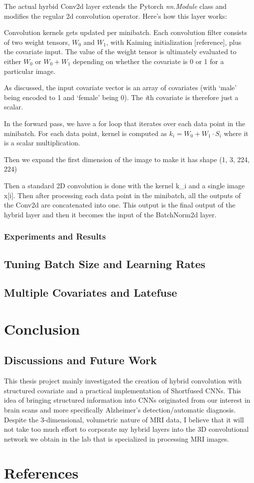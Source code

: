 \documentclass[12pt]{article}
\begin{document}
The actual hyrbid Conv2d layer extends the Pytorch \textit{nn.Module} class and modifies the regular 2d convolution operator. Here's how this layer works:

Convolution kernels gets updated per minibatch. Each convolution filter consists of two weight tensors, $W_0$ and $W_1$, with Kaiming initialization [reference], plus the covariate input. The value of the weight tensor is ultimately evaluated to either $W_0$ or $W_0+W_1$ depending on whether the covariate is 0 or 1 for a particular image. 

As discussed, the input covariate vector is an array of covariates (with `male' being encoded to 1 and `female' being 0). The \textit{i}th covariate is therefore just a scalar. 

In the forward pass, we have a for loop that iterates over each data point in the minibatch. For each data point, kernel is computed as $k_i = W_0 + W_1 \cdot S_i$ where it is a scalar multiplication.

Then we expand the first dimension of the image to make it has shape (1, 3, 224, 224)

Then a standard 2D convolution is done with the kernel k\_i and a single image x[i]. Then after processing each data point in the minibatch, all the outputs of the Conv2d are concatenated into one. This output is the final output of the hybrid layer and then it becomes the input of the BatchNorm2d layer.

\subsubsection{Experiments and Results}


\subsection{Tuning Batch Size and Learning Rates}


\subsection{Multiple Covariates and Latefuse}

\section{Conclusion}

\subsection{Discussions and Future Work}
This thesis project mainly investigated the creation of hybrid convolution with structured covariate and a practical implementation of Shortfused CNNs. This idea of bringing structured information into CNNs originated from our interest in brain scans and more specifically Alzheimer's detection/automatic diagnosis. Despite the 3-dimensional, volumetric nature of MRI data, I believe that it will not take too much effort to corporate my hybrid layers into the 3D convolutional network we obtain in the lab that is specialized in processing MRI images. 

\section{References}
\end{document}
